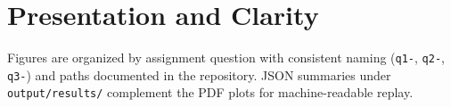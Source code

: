 \section{Presentation and Clarity}
\label{sec:presentation-clarity}

Figures are organized by assignment question with consistent naming (\texttt{q1-}, \texttt{q2-}, \texttt{q3-}) and paths documented in the repository. JSON summaries under \texttt{output/results/} complement the PDF plots for machine-readable replay.


